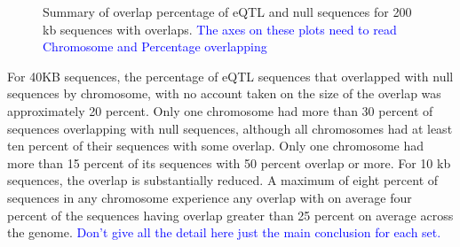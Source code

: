 \documentclass[12pt]{article}
\begin{document}
\begin{figure}[!htbp]%
\centering
{}%
\qquad
{} 
\caption{Summary of overlap percentage of eQTL and null sequences for 200 kb sequences with overlaps. \textcolor{blue}{The axes on these plots need to
read Chromosome and Percentage overlapping} }
\label{fig: 100kbOverlaps} 
\end{figure}  


For 40KB sequences, the percentage of eQTL sequences that overlapped with null sequences by chromosome, with no account taken on the size of the overlap 
was approximately 20 percent. Only one chromosome had more than 30 percent of sequences overlapping with null sequences, although all chromosomes had at least ten percent of their sequences with some overlap. Only one chromosome had more than 15 percent of its sequences with 50 percent overlap or more. For 10 kb sequences, the overlap is substantially reduced. A maximum of eight percent of sequences in any chromosome experience any overlap with on average 
four percent of the sequences having overlap greater than 25 percent on average across the genome. \textcolor{blue}{Don't give all the detail here just the main conclusion for each set.}
\end{document}
